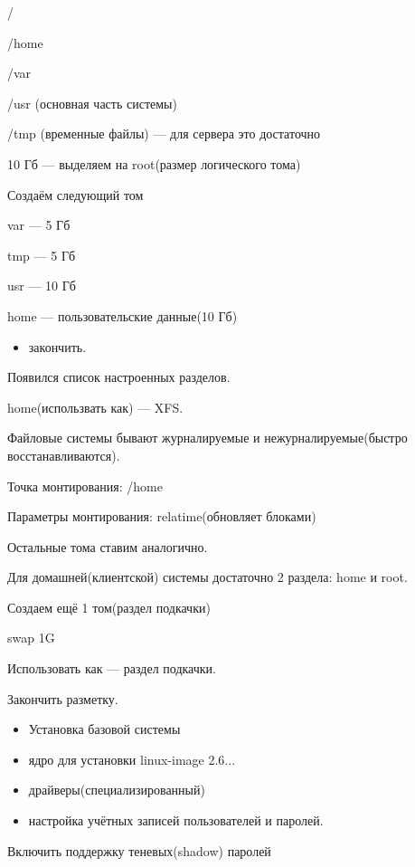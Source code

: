 \par 
/
\par 
/home
\par 
/var
\par 
/usr (основная часть системы)
\par 
/tmp (временные файлы) — для сервера это
достаточно
\par 
10 Гб — выделяем на root(размер логического
тома)
\par 
Создаём следующий том
\par 
var — 5 Гб
\par 
tmp — 5 Гб
\par 
usr — 10 Гб
\par 
home — пользовательские данные(10 Гб)
\begin{itemize}
	\item \par 
	закончить.
\end{itemize}
\par 
Появился список настроенных разделов.
\par 
home(использвать как) — XFS.
\par 
Файловые системы бывают журналируемые
и нежурналируемые(быстро восстанавливаются).
\par 
Точка монтирования: /home
\par 
Параметры монтирования: relatime(обновляет
блоками)
\par 
Остальные тома ставим аналогично.
\par 
Для домашней(клиентской) системы
достаточно 2 раздела: home и root.
\par 
Создаем ещё 1 том(раздел подкачки)
\par 
swap 1G
\par 
Использовать как — раздел подкачки.
\par 
Закончить разметку.
\begin{itemize}
	\item \par 
	Установка базовой системы
	\item \par 
	ядро для установки linux-image 2.6...
	\item \par 
	драйверы(специализированный)
	\item \par 
	настройка учётных записей пользователей
	и паролей.
\end{itemize}
\par 
Включить поддержку теневых(shadow) паролей
